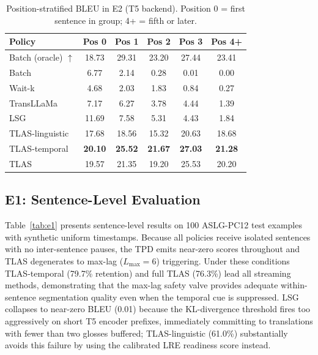 \documentclass[conference]{IEEEtran}
\begin{document}
\begin{table}[t]
\centering
\caption{Position-stratified BLEU in E2 (T5 backend). Position 0 = first sentence in group; 4+ = fifth or later.}
\label{tab:position}
\small
\begin{tabular}{lccccc}
\toprule
\textbf{Policy} & \textbf{Pos 0} & \textbf{Pos 1} & \textbf{Pos 2} & \textbf{Pos 3} & \textbf{Pos 4+} \\
\midrule
Batch (oracle) $\uparrow$ & 18.73 & 29.31 & 23.20 & 27.44 & 23.41 \\
\midrule
Batch          &  6.77 &  2.14 &  0.28 &  0.01 &  0.00 \\
Wait-k         &  4.68 &  2.03 &  1.83 &  0.84 &  0.27 \\
TransLLaMa     &  7.17 &  6.27 &  3.78 &  4.44 &  1.39 \\
\midrule
LSG            & 11.69 &  7.58 &  5.31 &  4.43 &  1.84 \\
TLAS-linguistic& 17.68 & 18.56 & 15.32 & 20.63 & 18.68 \\
TLAS-temporal  & \textbf{20.10} & \textbf{25.52} & \textbf{21.67} & \textbf{27.03} & \textbf{21.28} \\
TLAS           & 19.57 & 21.35 & 19.20 & 25.53 & 20.20 \\
\bottomrule
\end{tabular}
\end{table}

\subsection{E1: Sentence-Level Evaluation}

Table~\ref{tab:e1} presents sentence-level results on 100 ASLG-PC12 test examples with synthetic uniform timestamps. Because all policies receive isolated sentences with no inter-sentence pauses, the TPD emits near-zero scores throughout and TLAS degenerates to max-lag ($L_{\max}=6$) triggering. Under these conditions TLAS-temporal (79.7\% retention) and full TLAS (76.3\%) lead all streaming methods, demonstrating that the max-lag safety valve provides adequate within-sentence segmentation quality even when the temporal cue is suppressed. LSG collapses to near-zero BLEU (0.01) because the KL-divergence threshold fires too aggressively on short T5 encoder prefixes, immediately committing to translations with fewer than two glosses buffered; TLAS-linguistic (61.0\%) substantially avoids this failure by using the calibrated LRE readiness score instead.
\end{document}
